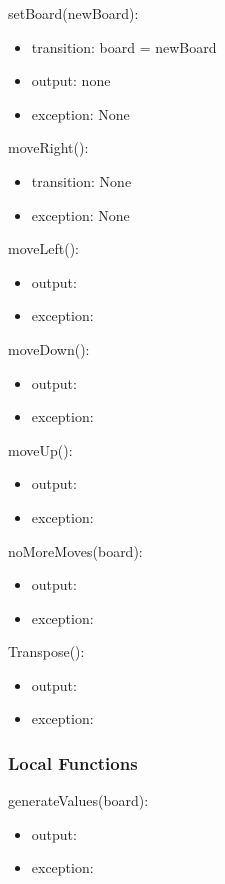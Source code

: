 \documentclass[12pt]{article}
\begin{document}
\noindent setBoard(newBoard):
\begin{itemize}
\item transition: board = newBoard
\item output: none
\item exception: None
\end{itemize}

\noindent moveRight():
\begin{itemize}
\item transition: None
\item exception: None
\end{itemize}

\noindent moveLeft():
\begin{itemize}
\item output:
\item exception:
\end{itemize}

\noindent moveDown():
\begin{itemize}
\item output:
\item exception:
\end{itemize}

\noindent moveUp():
\begin{itemize}
\item output:
\item exception:
\end{itemize}

\noindent noMoreMoves(board):
\begin{itemize}
\item output:
\item exception:
\end{itemize}

\noindent Transpose():
\begin{itemize}
\item output:
\item exception:
\end{itemize}

\subsubsection* {Local Functions}

\noindent generateValues(board):
\begin{itemize}
\item output:
\item exception:
\end{itemize}
\end{document}
